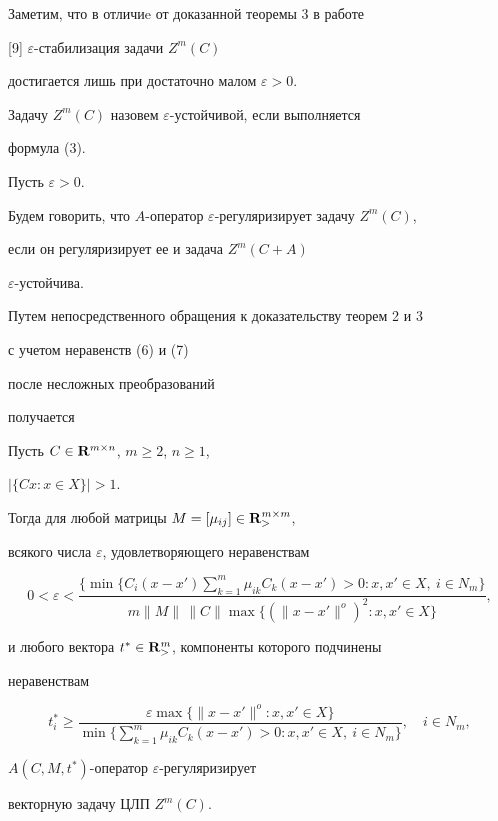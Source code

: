 Заметим, что в отличиe от доказанной теоремы 3 в работе


[9] $\varepsilon$-стабилизация задачи $Z^m(C)$


достигается лишь при достаточно малом $\varepsilon >0$.


Задачу $Z^m(C)$ назовем $\varepsilon$-устойчивой, если выполняется


формула (3).


Пусть $\varepsilon >0$.


Будем говорить, что $A$-оператор $\varepsilon$-регуляризирует задачу $Z^m(C)$,


если он регуляризирует ее и задача $Z^m(C+A)$\;


$\varepsilon$-устойчива.





Путем непосредственного обращения к доказательству теорем 2 и 3


с учетом неравенств (6) и (7)


после несложных преобразований


получается





\begin{thm}


Пусть $C\in {\bold R}^{m\times n}$, $m\ge 2$, $n\ge 1$,


$| \{Cx: x\in X\}| > 1$.


Тогда для любой матрицы $M=[\mu_{ij}]\in {\bold R}_>^{m\times m}$,


всякого числа $\varepsilon$, удовлетворяющего неравенствам


$$


0<\varepsilon <\frac{\Big\{\min\{C_i(x-x')\sum\limits_{k=1}^m


\mu_{ik}C_k(x-x')>0:


x, x'\in X,\ i\in N_m\Big\}}


{m\| M\|\, \| C\|


\max\{(\| x-x'\|^o)^2: x, x'\in X\}},


$$


и любого вектора $t^* \in {\bold R}^m_>$, компоненты которого подчинены


неравенствам


$$


t^*_i\ge \frac{\varepsilon


\max\{\| x-x'\|^o: x, x'\in X\}}


{\min\Big\{\sum\limits_{k=1}^m\mu_{ik}C_k(x-x')>0:


x, x'\in X,\ i\in N_m\Big\}},\quad i\in N_m,


$$


$A(C, M, t^*)$-оператор $\varepsilon$-регуляризирует


векторную задачу ЦЛП $Z^m(C)$.


\end{thm}





